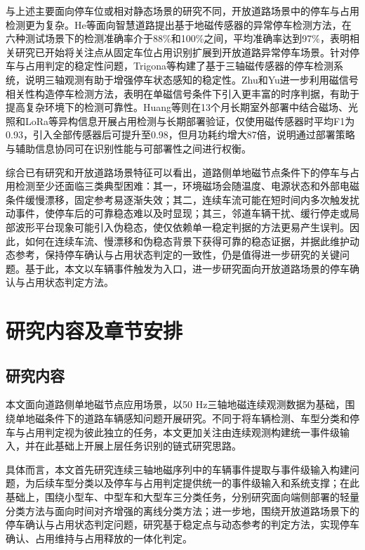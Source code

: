 \documentclass{xdupgthesis}
\begin{document}
与上述主要面向停车位或相对静态场景的研究不同，开放道路场景中的停车与占用检测更为复杂。He等\cite{R43}面向智慧道路提出基于地磁传感器的异常停车检测方法，在六种测试场景下的检测准确率介于88\%和100\%之间，平均准确率达到97\%，表明相关研究已开始将关注点从固定车位占用识别扩展到开放道路异常停车场景。针对停车与占用判定的稳定性问题，Trigona等\cite{ch4_trigona2016smartparking}构建了基于三轴磁传感器的停车检测系统，说明三轴观测有助于增强停车状态感知的稳定性。Zhu和Yu\cite{ch4_zhu2015parkingcorr}进一步利用磁信号相关性构造停车检测方法，表明在单磁信号条件下引入更丰富的时序判据，有助于提高复杂环境下的检测可靠性。Huang等\cite{ch4_huang2017easydeploy}则在13个月长期室外部署中结合磁场、光照和LoRa等异构信息开展占用检测与长期部署验证，仅使用磁传感器时平均F1为0.93，引入全部传感器后可提升至0.98，但月功耗约增大87倍，说明通过部署策略与辅助信息协同可在识别性能与可部署性之间进行权衡。

综合已有研究和开放道路场景特征可以看出，道路侧单地磁节点条件下的停车与占用检测至少还面临三类典型困难：其一，环境磁场会随温度、电源状态和外部电磁条件缓慢漂移，固定参考易逐渐失效；其二，连续车流可能在短时间内多次触发扰动事件，使停车后的可靠稳态难以及时显现；其三，邻道车辆干扰、缓行停走或局部波形平台现象可能引入伪稳态，使仅依赖单一稳定判据的方法更易产生误判。因此，如何在连续车流、慢漂移和伪稳态背景下获得可靠的稳态证据，并据此维护动态参考，保持停车确认与占用状态判定的一致性，仍是值得进一步研究的关键问题。基于此，本文以车辆事件触发为入口，进一步研究面向开放道路场景的停车确认与占用状态判定方法。


\section{研究内容及章节安排}
\label{sec:intro_content}

\subsection{研究内容}
\label{sec:research_content}

本文面向道路侧单地磁节点应用场景，以50 Hz三轴地磁连续观测数据为基础，围绕单地磁条件下的道路车辆感知问题开展研究。不同于将车辆检测、车型分类和停车与占用判定视为彼此独立的任务，本文更加关注由连续观测构建统一事件级输入，并在此基础上开展上层任务识别的链式研究思路。

具体而言，本文首先研究连续三轴地磁序列中的车辆事件提取与事件级输入构建问题，为后续车型分类以及停车与占用判定提供统一的事件级输入和系统支撑；在此基础上，围绕小型车、中型车和大型车三分类任务，分别研究面向端侧部署的轻量分类方法与面向时间对齐增强的离线分类方法；进一步地，围绕开放道路场景下的停车确认与占用状态判定问题，研究基于稳定点与动态参考的判定方法，实现停车确认、占用维持与占用释放的一体化判定。
\end{document}
